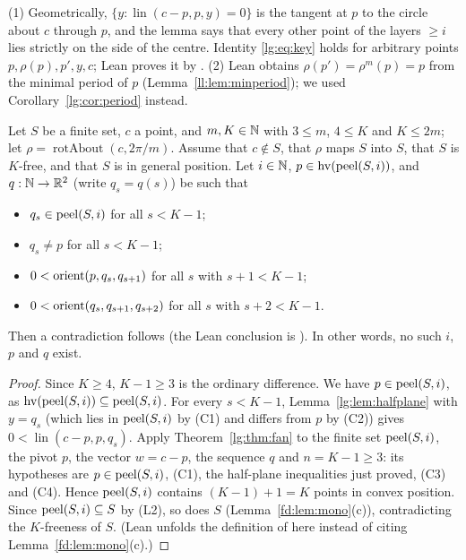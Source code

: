 \begin{remark}
(1) Geometrically, $\{y:\operatorname{lin}(c-p,p,y)=0\}$ is the tangent at $p$ to the circle about $c$ through $p$, and
the lemma says that every other point of the layers $\ge i$ lies strictly on the side of the centre. Identity
\eqref{lg:eq:key} holds for arbitrary points $p,\rho(p),p',y,c$; Lean proves it by .
(2) Lean obtains $\rho(p')=\rho^{m}(p)=p$ from the minimal period of $p$ (Lemma~\ref{ll:lem:minperiod}); we used
Corollary~\ref{lg:cor:period} instead.
\end{remark}

\begin{theorem}\label{lg:thm:chain}
Let $S$ be a finite set, $c$ a point, and $m,K\in\mathbb N$ with $3\le m$, $4\le K$ and $K\le 2m$; let
$\rho=\operatorname{rotAbout}(c,2\pi/m)$. Assume that $c\notin S$, that $\rho$ maps $S$ into $S$, that $S$ is $K$-free,
and that $S$ is in general position. Let $i\in\mathbb N$, $p\in\operatorname{hv}(\operatorname{peel}(S,i))$, and $q:\mathbb N\to\mathbb R^2$ (write $q_s=q(s)$) be such
that
\begin{itemize}
\item[(C1)] $q_s\in\operatorname{peel}(S,i)$ for all $s<K-1$;
\item[(C2)] $q_s\ne p$ for all $s<K-1$;
\item[(C3)] $0<\operatorname{orient}(p,q_s,q_{s+1})$ for all $s$ with $s+1<K-1$;
\item[(C4)] $0<\operatorname{orient}(q_s,q_{s+1},q_{s+2})$ for all $s$ with $s+2<K-1$.
\end{itemize}
Then a contradiction follows (the Lean conclusion is ). In other words, no such $i$, $p$ and $q$ exist.
\end{theorem}

\begin{proof}
Since $K\ge4$, $K-1\ge3$ is the ordinary difference. We have $p\in\operatorname{peel}(S,i)$, as $\operatorname{hv}(\operatorname{peel}(S,i))\subseteq\operatorname{peel}(S,i)$.
For every $s<K-1$, Lemma~\ref{lg:lem:halfplane} with $y=q_s$ (which lies in $\operatorname{peel}(S,i)$ by (C1) and differs from $p$
by (C2)) gives $0<\operatorname{lin}(c-p,p,q_s)$. Apply Theorem~\ref{lg:thm:fan} to the finite set $\operatorname{peel}(S,i)$, the
pivot $p$, the vector $w=c-p$, the sequence $q$ and $n=K-1\ge3$: its hypotheses are $p\in\operatorname{peel}(S,i)$, (C1), the
half-plane inequalities just proved, (C3) and (C4). Hence $\operatorname{peel}(S,i)$ contains $(K-1)+1=K$ points in convex position.
Since $\operatorname{peel}(S,i)\subseteq S$ by (L2), so does $S$ (Lemma~\ref{fd:lem:mono}(c)), contradicting the $K$-freeness of
$S$. (Lean unfolds the definition of  here instead of citing Lemma~\ref{fd:lem:mono}(c).)
\end{proof}

